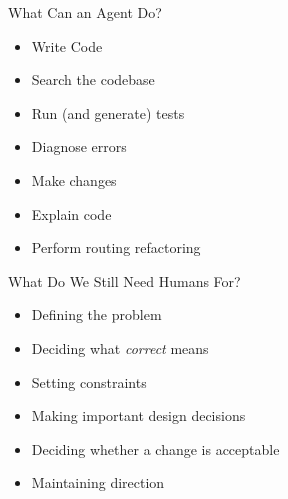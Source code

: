 \documentclass[
ps,
]{prosper}
\begin{document}
\begin{slide}{What Can an Agent Do?}

\begin{itemize}

\item Write Code

\item Search the codebase

\item Run (and generate) tests

\item Diagnose errors

\item Make changes

\item Explain code

\item Perform routing refactoring

\end{itemize}
  
\end{slide}



\begin{slide}{What Do We Still Need Humans For?}

\begin{itemize}

\item Defining the problem

\item Deciding what \emph{correct} means

\item Setting constraints

\item Making important design decisions

\item Deciding whether a change is acceptable

\item Maintaining direction

\end{itemize}
  
\end{slide}
\end{document}
